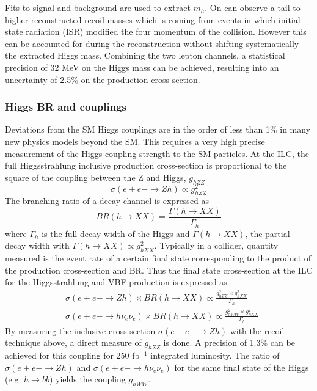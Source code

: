 Fits to signal and background are used to extract $m_h$. On can observe a tail to higher reconstructed recoil masses which is coming from events in which initial state radiation (ISR) modified the four momentum of the collision. However this can be accounted for during the reconstruction without shifting systematically the extracted Higgs mass. Combining the two lepton channels, a statistical precision of 32 MeV on the Higgs mass can be achieved, resulting into an uncertainty of 2.5\% on the production cross-section.

\subsubsection{Higgs BR and couplings}

Deviations from the SM Higgs couplings are in the order of less than 1\% in many new physics models beyond the SM. This requires a very high precise measurement of the Higgs coupling strength to the SM particles. At the ILC, the full Higgsstrahlung inclusive production cross-section is proportional to the square of the coupling between the Z and Higgs, $g_{hZZ}$
\begin{equation}
  \sigma(e+e- \rightarrow Zh) \propto g^2_{hZZ}
\end{equation}
The branching ratio of a decay channel is expressed as
\begin{equation}
  BR(h \rightarrow XX) = \frac{\Gamma(h \rightarrow XX)}{\Gamma_{h}}
\end{equation}
where $\Gamma_{h}$ is the full decay width of the Higgs and $\Gamma(h \rightarrow XX)$, the partial decay width with $\Gamma(h \rightarrow XX) \propto g^2_{hXX}$. Typically in a collider, quantity measured is the event rate of a certain final state corresponding to the product of the production cross-section and BR. Thus the final state cross-section at the ILC for the Higgsstrahlung and VBF production is expressed as
\begin{equation}
  \begin{aligned}
    &\sigma(e+e- \rightarrow Zh) \times BR(h \rightarrow XX) \propto \frac{g^2_{hZZ} \times g^2_{hXX}}{\Gamma_{h}}\\
    &\sigma(e+e- \rightarrow h\nu_e\nu_e) \times BR(h \rightarrow XX) \propto \frac{g^2_{hWW} \times g^2_{hXX}}{\Gamma_{h}}
  \end{aligned}
\end{equation}
By measuring the inclusive cross-section $\sigma(e+e- \rightarrow Zh)$ with the recoil technique above, a direct measure of $g_{hZZ}$ is done. A precision of 1.3\% can be achieved for this coupling for 250 fb$^{-1}$ integrated luminosity. The ratio of $\sigma(e+e- \rightarrow Zh)$ and $\sigma(e+e- \rightarrow h\nu_e\nu_e)$ for the same final state of the Higgs (e.g. $h \rightarrow bb$) yields the coupling $g_{hWW}$.

